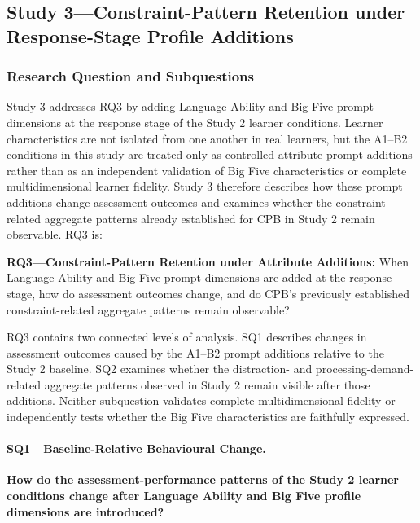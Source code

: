 \subsection[Study 3---Constraint-Pattern Retention under Profile Additions]{Study 3---Constraint-Pattern Retention under Response-Stage Profile Additions}

\subsubsection{Research Question and Subquestions}
\label{subsubsec:study3-rq}

Study 3 addresses RQ3 by adding Language Ability and Big Five prompt dimensions at the response stage of the Study 2 learner conditions. Learner characteristics are not isolated from one another in real learners, but the A1--B2 conditions in this study are treated only as controlled attribute-prompt additions rather than as an independent validation of Big Five characteristics or complete multidimensional learner fidelity. Study 3 therefore describes how these prompt additions change assessment outcomes and examines whether the constraint-related aggregate patterns already established for CPB in Study 2 remain observable. RQ3 is:

{
\textbf{RQ3---Constraint-Pattern Retention under Attribute Additions:} When Language Ability and Big Five prompt dimensions are added at the response stage, how do assessment outcomes change, and do CPB's previously established constraint-related aggregate patterns remain observable?
\par}

RQ3 contains two connected levels of analysis. SQ1 describes changes in assessment outcomes caused by the A1--B2 prompt additions relative to the Study 2 baseline. SQ2 examines whether the distraction- and processing-demand-related aggregate patterns observed in Study 2 remain visible after those additions. Neither subquestion validates complete multidimensional fidelity or independently tests whether the Big Five characteristics are faithfully expressed.

\paragraph{SQ1---Baseline-Relative Behavioural Change.}

{
\textbf{How do the assessment-performance patterns of the Study 2 learner conditions change after Language Ability and Big Five profile dimensions are introduced?}
\par}

